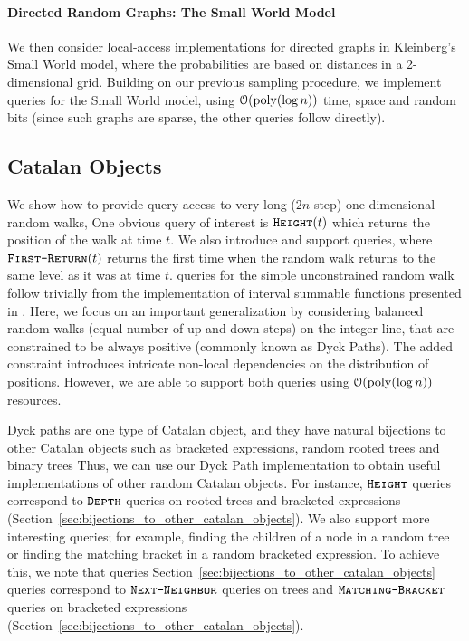 \paragraph*{Directed Random Graphs: The Small World Model}
\label{par:directed_random_graphs}
We then consider local-access implementations for directed graphs in Kleinberg's Small World model,
where the probabilities are based on distances in a 2-dimensional grid.
Building on our previous sampling procedure, we implement  queries for the Small World model,
using $\mathcal{O}(\mathrm{poly}(\log n))$ time, space and random bits (since such graphs are sparse, the other queries follow directly).




\subsection{Catalan Objects}%
\label{sec:intro_catalan_objects}
We show how to provide query access to very long ($2n$ step) one dimensional random walks,
One obvious query of interest is $\texttt{\textsc{Height}}(t)$ which returns the position of the walk at time $t$.
We also introduce and support  queries, where $\texttt{\textsc{First-Return}}(t)$ returns
the first time when the random walk returns to the same level as it was at time $t$.
 queries for the simple unconstrained random walk
follow trivially from the implementation of interval summable functions presented in \cite{huge}.
Here, we focus on an important generalization by considering balanced random walks (equal number of up and down steps) on the integer line,
that are constrained to be always positive (commonly known as Dyck Paths).
The added constraint introduces intricate non-local dependencies on the distribution of positions.
However, we are able to support both queries using $\mathcal O(\mathrm{poly}(\log n))$ resources.

Dyck paths are one type of Catalan object, and they have natural bijections to other Catalan objects
such as bracketed expressions, random rooted trees and binary trees
Thus, we can use our Dyck Path implementation to obtain useful implementations of other random Catalan objects.
For instance, $\texttt{\textsc{Height}}$ queries correspond to $\texttt{\textsc{Depth}}$ queries on rooted trees and bracketed expressions
(Section~\ref{sec:bijections_to_other_catalan_objects}).
We also support more interesting queries; for example, finding the children of a node in a random tree
or finding the matching bracket in a random bracketed expression.
To achieve this, we note that  queries Section~\ref{sec:bijections_to_other_catalan_objects} queries correspond to
$\texttt{\textsc{Next-Neighbor}}$ queries on trees and $\texttt{\textsc{Matching-Bracket}}$ queries on bracketed expressions
(Section~\ref{sec:bijections_to_other_catalan_objects}).





